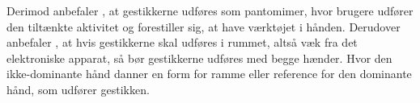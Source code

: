 Derimod anbefaler \textcite[s. 823]{PDF:UnderstandingNaturalness}, at gestikkerne udføres som pantomimer, hvor brugere udfører den tiltænkte aktivitet og forestiller sig, at have værktøjet i hånden. Derudover anbefaler \textcite[s. 824]{PDF:UnderstandingNaturalness}, at hvis gestikkerne skal udføres i rummet, altså væk fra det elektroniske apparat, så bør gestikkerne udføres med begge hænder. Hvor den ikke-dominante hånd danner en form for ramme eller reference for den dominante hånd, som udfører gestikken.      
%
